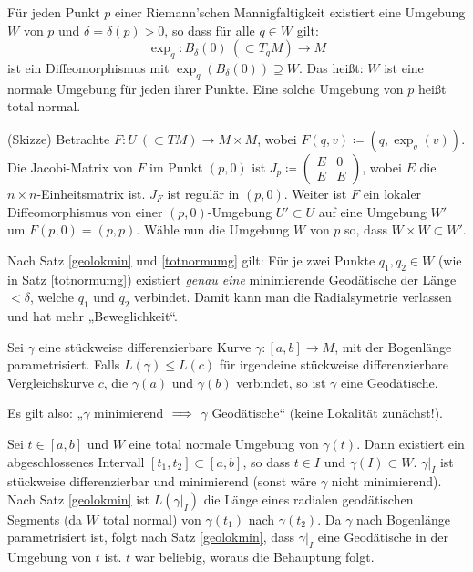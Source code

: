 \documentclass[a4paper,twoside,DIV15,BCOR12mm]{scrbook}
\renewcommand{\da}{\coloneqq}
\begin{document}
\begin{satz}
\label{totnormumg}
Für jeden Punkt $p$ einer Riemann’schen Mannigfaltigkeit existiert eine Umgebung $W$ von $p$ und $\delta = \delta(p)>0$, so dass für alle $q\in W$ gilt:
\[
\exp_q : B_\delta(0)\ (\subset T_qM) \to M
\]
ist ein Diffeomorphismus mit $\exp_q (B_\delta(0)) \supseteq W$. Das heißt: $W$ ist eine normale Umgebung für jeden ihrer Punkte. Eine solche Umgebung von $p$ heißt total normal.
\end{satz}

\begin{beweis}
(Skizze) Betrachte $F:U\ (\subset TM)\to M\times M$, wobei $F(q,v) \da (q,\exp_q(v))$. Die Jacobi-Matrix von $F$ im Punkt $(p,0)$ ist $J_p \da \begin{pmatrix} E & 0 \\ E & E \end{pmatrix}$, wobei $E$ die $n\times n$-Einheitsmatrix ist. $J_F$ ist regulär in $(p,0)$. Weiter ist $F$ ein lokaler Diffeomorphismus von einer $(p,0)$-Umgebung $U'\subset U$ auf eine Umgebung $W'$ um $F(p,0) = (p,p)$. Wähle nun die Umgebung $W$ von $p$ so, dass $W\times W\subset W'$.
\end{beweis}

\begin{bemerkung}
Nach Satz \ref{geolokmin} und \ref{totnormumg} gilt: Für je zwei Punkte $q_1,q_2\in W$ (wie in Satz \ref{totnormumg}) existiert \emph{genau eine} minimierende Geodätische der Länge $<\delta$, welche $q_1$ und $q_2$ verbindet. Damit kann man die Radialsymetrie verlassen und hat mehr „Beweglichkeit“.
\end{bemerkung}

\begin{korrolar}
Sei $\gamma$ eine stückweise differenzierbare Kurve $\gamma:[a,b]\to M$, mit der Bogenlänge parametrisiert. Falls $L(\gamma) \le L(c)$ für irgendeine
stückweise differenzierbare Vergleichskurve $c$, die $\gamma(a)$ und $\gamma(b)$ verbindet, so ist $\gamma$ eine Geodätische.

Es gilt also: „$\gamma$ minimierend $\implies$ $\gamma$ Geodätische“ (keine Lokalität zunächst!).
\end{korrolar}

\begin{beweis}
Sei $t\in[a,b]$ und $W$ eine total normale Umgebung von $\gamma(t)$. Dann existiert ein abgeschlossenes Intervall $[t_1,t_2] \subset [a,b]$, so dass $t\in I$ und $\gamma(I)\subset W$. $\gamma|_I$ ist stückweise differenzierbar und minimierend (sonst wäre $\gamma$ nicht minimierend). Nach Satz \ref{geolokmin} ist $L(\gamma|_I)$ die Länge eines radialen geodätischen Segments (da $W$ total normal) von $\gamma(t_1)$ nach $\gamma(t_2)$. Da $\gamma$ nach Bogenlänge parametrisiert ist, folgt nach Satz \ref{geolokmin}, dass $\gamma|_I$ eine Geodätische in der Umgebung von $t$ ist. $t$ war beliebig, woraus die Behauptung folgt.
\end{beweis}
\end{document}
